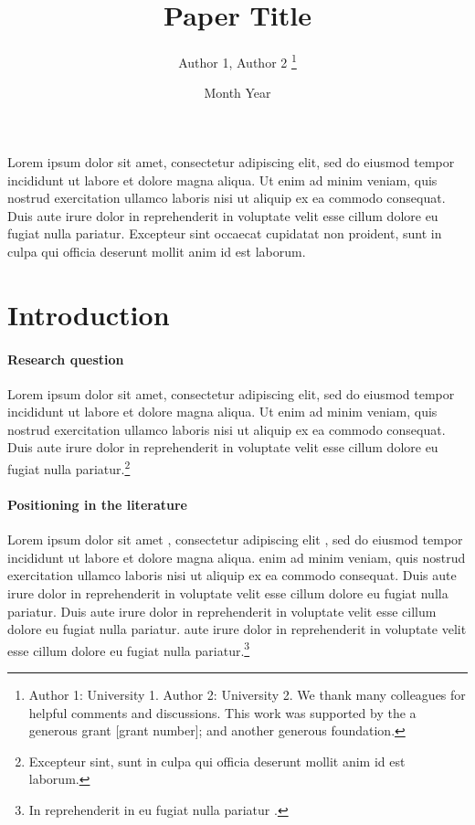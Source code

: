 \documentclass[letterpaper,12pt,leqno]{article}
\begin{document}
\title{Paper Title}
\author{Author 1, Author 2
\thanks{Author 1: University 1. Author 2: University 2. We thank many colleagues for helpful comments and discussions. This work was supported by the a generous grant [grant number]; and another generous foundation.}}
\date{Month Year}                       

\begin{titlepage}\maketitle

Lorem ipsum dolor sit amet, consectetur adipiscing elit, sed do eiusmod tempor incididunt ut labore et dolore magna aliqua. Ut enim ad minim veniam, quis nostrud exercitation ullamco laboris nisi ut aliquip ex ea commodo consequat. Duis aute irure dolor in reprehenderit in voluptate velit esse cillum dolore eu fugiat nulla pariatur. Excepteur sint occaecat cupidatat non proident, sunt in culpa qui officia deserunt mollit anim id est laborum.

\end{titlepage}\section{Introduction}\label{s:introduction}
 
\paragraph{Research question} Lorem ipsum dolor sit amet, consectetur adipiscing elit, sed do eiusmod tempor incididunt ut labore et dolore magna aliqua. Ut enim ad minim veniam, quis nostrud exercitation ullamco laboris nisi ut aliquip ex ea commodo consequat. Duis aute irure dolor in reprehenderit in voluptate velit esse cillum dolore eu fugiat nulla pariatur.\footnote{Excepteur sint, sunt in culpa qui officia deserunt mollit anim id est laborum.}

\paragraph{Positioning in the literature} Lorem ipsum dolor sit amet \citep{MS15}, consectetur adipiscing elit \citep[p. 1305]{MS19}, sed do eiusmod tempor incididunt ut labore et dolore magna aliqua. \citet{M12,M14} enim ad minim veniam, quis nostrud exercitation ullamco laboris nisi ut aliquip ex ea commodo consequat. Duis aute irure dolor in reprehenderit in voluptate velit esse cillum dolore eu fugiat nulla pariatur.  Duis aute irure dolor in reprehenderit in voluptate velit esse cillum dolore eu fugiat nulla pariatur. \citeauthor{EMM21} aute irure dolor in reprehenderit in voluptate velit esse cillum dolore eu fugiat nulla pariatur.\footnote{In reprehenderit in eu fugiat nulla pariatur \citep{LMS18a}.}
\end{document}

